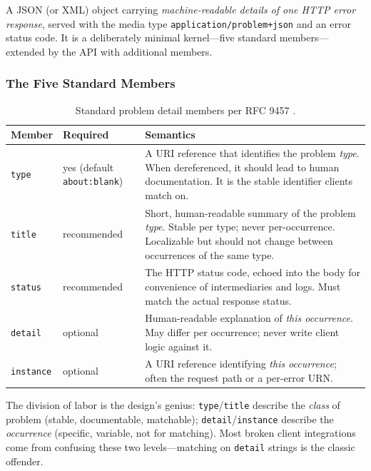 \begin{definition}
A JSON (or XML) object carrying \emph{machine-readable details of one HTTP
error response}, served with the media type
\texttt{application/problem+json} and an error status code. It is a
deliberately minimal kernel---five standard members---extended by the API
with additional members.
\end{definition}

\subsubsection{The Five Standard Members}

\begin{table}[h]
  \centering
  \small
  \begin{tabularx}{\textwidth}{l l X}
    \toprule
    \textbf{Member} & \textbf{Required} & \textbf{Semantics} \\
    \midrule
    \texttt{type} & yes (default \texttt{about:blank}) & A URI reference that
      identifies the problem \emph{type}. When dereferenced, it should lead
      to human documentation. It is the stable identifier clients match on. \\
    \texttt{title} & recommended & Short, human-readable summary of the
      problem \emph{type}. Stable per type; never per-occurrence. Localizable
      but should not change between occurrences of the same type. \\
    \texttt{status} & recommended & The HTTP status code, echoed into the body
      for convenience of intermediaries and logs. Must match the actual
      response status. \\
    \texttt{detail} & optional & Human-readable explanation of \emph{this
      occurrence}. May differ per occurrence; never write client logic
      against it. \\
    \texttt{instance} & optional & A URI reference identifying \emph{this
      occurrence}; often the request path or a per-error URN. \\
    \bottomrule
  \end{tabularx}
  \caption{Standard problem detail members per RFC 9457 \cite{rfc9457}.}
  \label{tab:problem-members}
\end{table}

The division of labor is the design's genius: \texttt{type}/\texttt{title}
describe the \emph{class} of problem (stable, documentable, matchable);
\texttt{detail}/\texttt{instance} describe the \emph{occurrence} (specific,
variable, not for matching). Most broken client integrations come from
confusing these two levels---matching on \texttt{detail} strings is the
classic offender.

